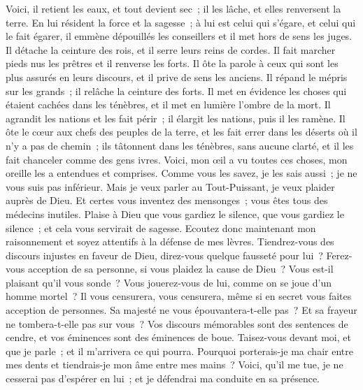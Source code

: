 \begin{multicols}{2}
Voici, il retient les eaux, et tout devient sec~; il les lâche, et elles renversent la terre.
En lui résident la force et la sagesse~; à lui est celui qui s'égare, et celui qui le fait égarer,
il emmène dépouillés les conseillers et il met hors de sens les juges.
Il détache la ceinture des rois, et il serre leurs reins de cordes.
Il fait marcher pieds nus les prêtres et il renverse les forts.
Il ôte la parole à ceux qui sont les plus assurés en leurs discours, et il prive de sens les anciens.
Il répand le mépris sur les grands~; il relâche la ceinture des forts.
Il met en évidence les choses qui étaient cachées dans les ténèbres, et il met en lumière l'ombre de la mort.
 Il agrandit les nations et les fait périr~; il élargit les nations, puis il les ramène.
Il ôte le cœur aux chefs des peuples de la terre, et les fait errer dans les déserts où il n'y a pas de chemin~;
ils tâtonnent dans les ténèbres, sans aucune clarté, et il les fait chanceler comme des gens ivres.
\VerseOne{}Voici, mon œil a vu toutes ces choses, mon oreille les a entendues et comprises.
Comme vous les savez, je les sais aussi~; je ne vous suis pas inférieur.
Mais je veux parler au Tout-Puissant, je veux plaider auprès de Dieu.
Et certes vous inventez des mensonges~; vous êtes tous des médecins inutiles.
Plaise à Dieu que vous gardiez le silence, que vous gardiez le silence~; et cela vous servirait de sagesse.
Ecoutez donc maintenant mon raisonnement et soyez attentifs à la défense de mes lèvres.
Tiendrez-vous des discours injustes en faveur de Dieu, direz-vous quelque fausseté pour lui~?
Ferez-vous acception de sa personne, si vous plaidez la cause de Dieu~?
Vous est-il plaisant qu'il vous sonde~? Vous jouerez-vous de lui, comme on se joue d'un homme mortel~?
Il vous censurera, vous censurera, même si en secret vous faites acception de personnes.
Sa majesté ne vous épouvantera-t-elle pas~? Et sa frayeur ne tombera-t-elle pas sur vous~?
Vos discours mémorables sont des sentences de cendre, et vos éminences sont des éminences de boue.
Taisez-vous devant moi, et que je parle~; et il m'arrivera ce qui pourra.
Pourquoi porterais-je ma chair entre mes dents et tiendrais-je mon âme entre mes mains~?
Voici, qu'il me tue, je ne cesserai pas d'espérer en lui~; et je défendrai ma conduite en sa présence.

\end{multicols}

